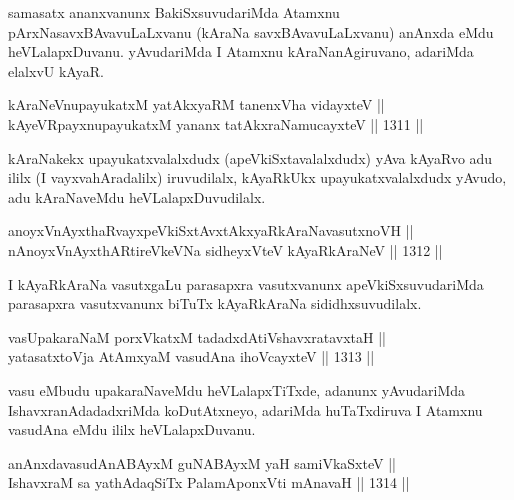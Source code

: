 \begin{artha}
samasatx ananxvanunx BakiSxsuvudariMda Atamxnu pArxNasavxBAvavuLaLxvanu (kAraNa savxBAvavuLaLxvanu) anAnxda eMdu heVLalapxDuvanu. yAvudariMda I Atamxnu kAraNanAgiruvano, adariMda elalxvU kAyaR.
\end{artha}

\begin{shl}
kAraNeV\s nupayukatxM yatAkxyaRM tanenxVha vidayxteV || \\
kAyeVR\s payxnupayukatxM yananx tatAkxraNamucayxteV ||  1311 ||  
\end{shl}

\begin{artha}
kAraNakekx upayukatxvalalxdudx (apeVkiSxtavalalxdudx) yAva kAyaRvo adu ililx (I vayxvahAradalilx) iruvudilalx, kAyaRkUkx upayukatxvalalxdudx yAvudo, adu kAraNaveMdu heVLalapxDuvudilalx.
\end{artha}


\begin{shl}
anoyxVnAyxthaRvayxpeVkiSxtAvxtAkxyaRkAraNavasutxnoVH || \\
nAnoyxVnAyxthARtireVkeVNa sidheyxVteV kAyaRkAraNeV ||  1312 ||  
\end{shl}

\begin{artha}
I kAyaRkAraNa vasutxgaLu parasapxra vasutxvanunx apeVkiSxsuvudariMda parasapxra vasutxvanunx biTuTx kAyaRkAraNa sididhxsuvudilalx.
\end{artha}

\begin{shl}
vasUpakaraNaM porxVkatxM tadadxdAtiVshavxratavxtaH || \\
yatasatxtoV\s ja AtAmx\s yaM vasudAna ihoVcayxteV ||  1313 ||  
\end{shl}

\begin{artha}
vasu eMbudu upakaraNaveMdu heVLalapxTiTxde, adanunx yAvudariMda IshavxranAdadadxriMda koDutAtxneyo, adariMda huTaTxdiruva I Atamxnu vasudAna eMdu ililx heVLalapxDuvanu.
\end{artha}

\begin{shl}
anAnxdavasudAnABAyxM guNABAyxM yaH samiVkaSxteV ||  \\
IshavxraM sa yathAdaqSiTx PalamAponxVti mAnavaH ||  1314 ||  
\end{shl}

